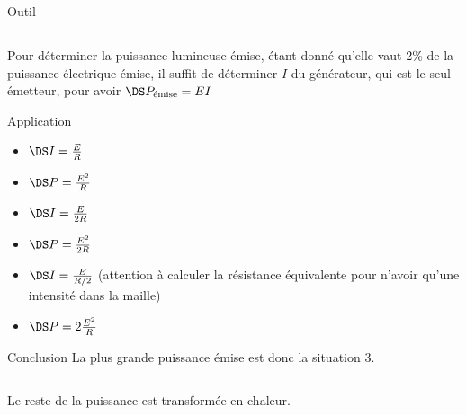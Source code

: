 \documentclass[../main/main.tex]{subfiles}
\begin{document}
\begin{tcbraster}[raster columns=4, raster equal height=rows]
\begin{NCdemo}[raster multicolumn=1]{Outil}
        \subsection{}
        Pour déterminer la puissance lumineuse émise, étant donné qu'elle vaut
        2\% de la puissance électrique émise, il suffit de déterminer $I$ du
        générateur, qui est le seul émetteur, pour avoir $\DS P_{\text{émise}} =
        EI$
    \end{NCdemo}
    \begin{NCexem}[raster multicolumn=3]{Application}
        \begin{minipage}{0.3\linewidth}
            \begin{itemize}
                \item $\DS I = \frac{E}{R}$
                \item $\DS P = \frac{E^2}{R}$
            \end{itemize}
        \end{minipage}
        \hfill
        \vrule
        \hfill
        \begin{minipage}{0.3\linewidth}
            \begin{itemize}
                \item $\DS I = \frac{E}{2R}$
                \item $\DS P = \frac{E^2}{2R}$
            \end{itemize}
        \end{minipage}
        \hfill
        \vrule
        \hfill
        \begin{minipage}{0.3\linewidth}
            \begin{itemize}
                \item $\DS I = \frac{E}{R/2}$\smallbreak
                    (attention à calculer la résistance équivalente pour n'avoir
                    qu'une intensité dans la maille)
                \item $\DS P = 2 \frac{E^2}{R}$
            \end{itemize}
        \end{minipage}
    \end{NCexem}
    \begin{NCprop}[raster multicolumn=1]{Conclusion}
        La plus grande puissance émise est donc la situation 3.
        \subsection{}
        Le reste de la puissance est transformée en chaleur.
    \end{NCprop}
\end{tcbraster}
\end{document}
